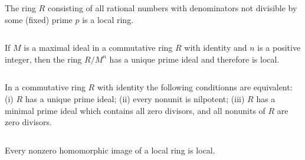 $$ $$

\begin{ex}
    The ring $R$ consisting of all rational numbers with denominators not divisible by some (fixed) prime $p$ is a local ring.
\end{ex}

$$ $$

\begin{ex}
    If $M$ is a maximal ideal in a commutative ring $R$ with identity and $n$ is a positive integer, then the ring $R /M^{n}$ has a unique prime ideal and therefore is local.
\end{ex}

$$ $$

\begin{ex}
    In a commutative ring $R$ with identity the following conditionns are equivalent: (i) $R$ has a unique prime ideal; (ii) every nonunit is nilpotent; (iii) $R$ has a minimal prime ideal which contains all zero divisors, and all nonunits of $R$ are zero divisors.
\end{ex}

$$ $$

\begin{ex}
    Every nonzero homomorphic image of a local ring is local.
\end{ex}